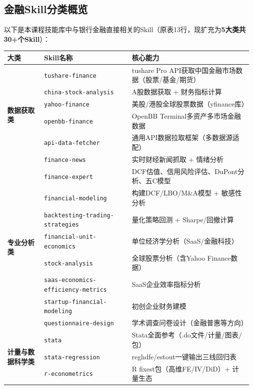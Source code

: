 \subsection{金融Skill分类概览}

以下是本课程技能库中与银行金融直接相关的Skill（原表13行，现扩充为\textbf{5大类共30+个Skill}）：

\begin{table}[H]
\centering
\begin{tabular}{lp{2.8cm}p{8cm}}
\toprule
\textbf{大类} & \textbf{Skill名称} & \textbf{核心能力} \\
\midrule
\multirow{6}{*}{\textbf{数据获取类}} & \texttt{tushare-finance} & tushare Pro API获取中国金融市场数据（股票/基金/期货） \\
& \texttt{china-stock-analysis} & A股数据获取 + 财务指标计算 \\
& \texttt{yahoo-finance} & 美股/港股全球股票数据（yfinance库） \\
& \texttt{openbb-finance} & OpenBB Terminal多资产多市场金融数据 \\
& \texttt{api-data-fetcher} & 通用API数据拉取框架（多数据源适配） \\
& \texttt{finance-news} & 实时财经新闻抓取 + 情绪分析 \\
\midrule
\multirow{8}{*}{\textbf{专业分析类}} & \texttt{finance-expert} & DCF估值、信用风险评估、DuPont分析、五C模型 \\
& \texttt{financial-modeling} & 构建DCF/LBO/M\&A模型 + 敏感性分析 \\
& \texttt{backtesting-trading-strategies} & 量化策略回测 + Sharpe/回撤计算 \\
& \texttt{financial-unit-economics} & 单位经济学分析（SaaS/金融科技） \\
& \texttt{stock-analysis} & 全球股票分析（含Yahoo Finance数据） \\
& \texttt{saas-economics-efficiency-metrics} & SaaS企业效率指标分析 \\
& \texttt{startup-financial-modeling} & 初创企业财务建模 \\
& \texttt{questionnaire-design} & 学术调查问卷设计（金融普惠等方向） \\
\midrule
\multirow{8}{*}{\textbf{计量与数据科学类}} & \texttt{stata} & Stata全面参考（.do文件/计量/图表/包） \\
& \texttt{stata-regression} & reghdfe/estout一键输出三线回归表 \\
& \texttt{r-econometrics} & R fixest包（高维FE/IV/DiD）+ 计量生态 \\

\end{tabular}
\end{table}
